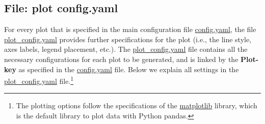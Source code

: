 \documentclass[10pt,a4paper]{article}
\begin{document}
\subsection{File: plot config.yaml}

For every plot that is specified in the main configuration file \url{config.yaml}, the file \url{plot_config.yaml} provides further specifications for the plot (i.e., the line style, axes labels, legend placement, etc.). The \url{plot_config.yaml} file contains all the necessary configurations for each plot to be generated, and is linked by the \textbf{Plot-key} as specified in the \url{config.yaml} file. Below we explain all settings in the \url{plot_config.yaml} file.\footnote{The plotting options follow the specifications of the \url{matplotlib} library, which is the default library to plot data with Python pandas.}
\end{document}
